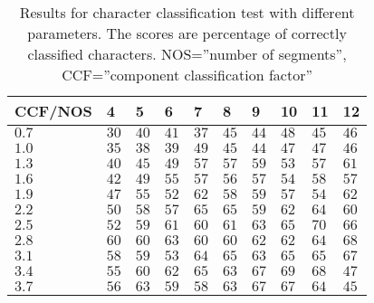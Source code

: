\begin{table}[htb]
  \begin{center}
  \begin{tabular}{ l | l l l l l l l l l }
    CCF/NOS & 4   & 5    & 6    & 7    & 8    & 9    & 10   & 11 & 12 \\ \hline
    $0.7$  & $30$ & $40$ & $41$ & $37$ & $45$ & $44$ & $48$ & $45$ & $46$\\ 
    $1.0$  & $35$ & $38$ & $39$ & $49$ & $45$ & $44$ & $47$ & $47$ & $46$\\ 
    $1.3$  & $40$ & $45$ & $49$ & $57$ & $57$ & $59$ & $53$ & $57$ & $61$\\
    $1.6$  & $42$ & $49$ & $55$ & $57$ & $56$ & $57$ & $54$ & $58$ & $57$\\   
    $1.9$  & $47$ & $55$ & $52$ & $62$ & $58$ & $59$ & $57$ & $54$ & $62$\\  
    $2.2$  & $50$ & $58$ & $57$ & $65$ & $65$ & $59$ & $62$ & $64$ & $60$\\ 
    $2.5$  & $52$ & $59$ & $61$ & $60$ & $61$ & $63$ & $65$ & \textbf{$70$} & $66$\\ 
    $2.8$  & $60$ & $60$ & $63$ & $60$ & $60$ & $62$ & $62$ & $64$ & $68$\\ 
    $3.1$  & $58$ & $59$ & $53$ & $64$ & $65$ & $63$ & $65$ & $65$ & $67$\\ 
    $3.4$  & $55$ & $60$ & $62$ & $65$ & $63$ & $67$ & $69$ & $68$ & $47$\\ 
    $3.7$  & $56$ & $63$ & $59$ & $58$ & $63$ & $67$ & $67$ & $64$ & $45$\\ 
  \end{tabular}
\end{center}
\caption{Results for character classification test with different parameters. The scores are percentage of correctly classified characters.
	 NOS=''number of segments'',
         CCF=''component classification factor''}
\label{tab:word_classifier_results_generated_data} 
\end{table}
